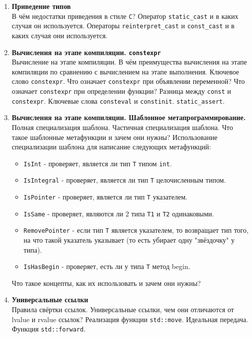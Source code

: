 \documentclass{article}
\begin{document}
\begin{enumerate}
\item \textbf{Приведение типов}\\
В чём недостатки приведения в стиле \texttt{C}? Оператор \texttt{static\_cast} и в каких случая он используется. Операторы \texttt{reinterpret\_cast} и \texttt{const\_cast} и в каких случая они используется. 




\item \textbf{Вычисления на этапе компиляции. \texttt{constexpr}} \\
Вычисление на этапе компиляции. В чём преимущества вычисления на этапе компиляции по сравнению с вычислением на этапе выполнения.  Ключевое слово \texttt{constexpr}. Что означает \texttt{constexpr} при объявлении переменной? Что означает \texttt{constexpr} при определении функции? Разница между \texttt{const} и \texttt{constexpr}. Ключевые слова \texttt{consteval} и \texttt{constinit}. \texttt{static\_assert}.


\item \textbf{Вычисления на этапе компиляции. Шаблонное метапрограммирование.} \\
Полная специализация шаблона. Частичная специализация шаблона. Что такое шаблонные метафункции и зачем они нужны? Использование специализации шаблона для написание следующих метафункций:
\begin{itemize}
\item \texttt{IsInt} - проверяет, является ли тип \texttt{T} типом \texttt{int}.
\item \texttt{IsIntegral} - проверяет, является ли тип \texttt{T} целочисленным типом.
\item \texttt{IsPointer} - проверяет, является ли тип \texttt{T} указателем.
\item \texttt{IsSame} - проверяет, являются ли 2 типа \texttt{T1} и \texttt{T2} одинаковыми.
\item \texttt{RemovePointer} - если тип \texttt{T} является указателем, то возвращает тип того, на что такой указатель указывает (то есть убирает одну "звёздочку" у типа).
\item \texttt{IsHasBegin} - проверяет, есть ли у типа \texttt{T} метод begin.
\end{itemize}
Что такое концепты, как их использовать и зачем они нужны?



\item \textbf{Универсальные ссылки}\\
Правила свёртки ссылок. Универсальные ссылки, чем они отличаются от lvalue и rvalue ссылок? Реализация функции \texttt{std::move}. Идеальная передача. Функция \texttt{std::forward}.

\end{enumerate}

\fi
\end{document}
